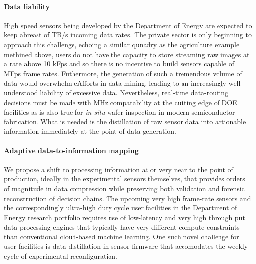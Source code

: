 \documentclass{article}
\begin{document}
\paragraph{Data liability}
High speed sensors being developed by the Department of Energy are expected to keep abreast of TB/s incoming data rates.
The private sector is only beginning to approach this challenge, echoing a similar qunadry as the agriculture example methined above, users do not have the capacity to store streaming raw images at a rate above 10 kFps and so there is no incentive to build sensors capable of MFps frame rates.
Futhermore, the generation of such a tremendous volume of data would overwhelm eAfforts in data mining, leading to an increasingly well understood liability of excessive data. 
Nevertheless, real-time data-routing decisions must be made with MHz compatability at the cutting edge of DOE facilities as is also true for \textit{in situ} wafer inspection in modern semiconductor fabrication.
What is needed is the distillation of raw sensor data into actionable information immediately at the point of data generation.


\paragraph{Adaptive data-to-information mapping}
We propose a shift to processing information at or very near to the point of production, ideally in the experimental sensors themselves, that provides orders of magnitude in data compression while preserving both validation and forensic reconstruction of decision chains.
The upcoming very high frame-rate sensors and the correspondingly ultra-high duty cycle user facilities in the Department of Energy research portfolio requires use of low-latency and very high through put data processing engines that typically have very different compute constraints than conventional cloud-based machine learning.
One such novel challenge for user facilities is data distillation in sensor firmware that accomodates the weekly cycle of experimental reconfiguration.
\end{document}
